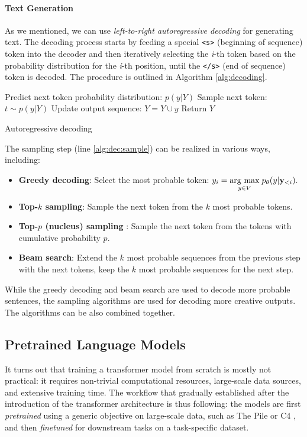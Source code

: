\paragraph{Text Generation} As we mentioned, we can use \textit{left-to-right autoregressive decoding} for generating text. The decoding process starts by feeding a special \texttt{<s>} (beginning of sequence) token into the decoder and then iteratively selecting the \emph{i}-th token based on the probability distribution for the \emph{i}-th position, until the  \texttt{</s>} (end of sequence) token is decoded. The procedure is outlined in Algorithm \ref{alg:decoding}.
\begin{algorithm}[ht]
    \begin{algorithmic}[1]
        \State Predict next token probability distribution: $p(y | Y)$
        \State Sample next token: $t \sim p(y | Y)$ \label{alg:dec:sample}
        \State Update output sequence: $Y = Y \cup y$
        \EndWhile
        \State Return $Y$
    \end{algorithmic}
    \caption{Autoregressive decoding}
    \label{alg:decoding}
\end{algorithm}

\noindent The sampling step (line \ref{alg:dec:sample}) can be realized in various ways, including:
\begin{itemize}
    \item \textbf{Greedy decoding}: Select the most probable token: $y_i = \underset{y \in V}{\operatorname{arg}\,\operatorname{max}}\; p_\theta(y|\mathbf{y}_{<i}).$
    \item \textbf{Top-$k$ sampling}: Sample the next token from the $k$ most probable tokens.
    \item \textbf{Top-$p$ (nucleus) sampling} \cite{holtzman2019curious}: Sample the next token from the tokens with cumulative probability $p$.
    \item \textbf{Beam search}: Extend the $k$ most probable sequences from the previous step with the next tokens, keep the $k$ most probable sequences for the next step.
\end{itemize}
While the greedy decoding and beam search are used to decode more probable sentences, the sampling algorithms are used for decoding more creative outputs. The algorithms can be also combined together.

\subsection{Pretrained Language Models}
\label{sec:plms}
It turns out that training a transformer model from scratch is mostly not practical: it requires non-trivial computational resources, large-scale data sources, and extensive training time. The workflow that gradually established after the introduction of the transformer architecture is thus following: the models are first \emph{pretrained} using a generic objective on large-scale data, such as The Pile \cite{gao2020pile} or C4 \cite{raffelExploringLimitsTransfer2019}, and then \emph{finetuned} for downstream tasks on a task-specific dataset.

